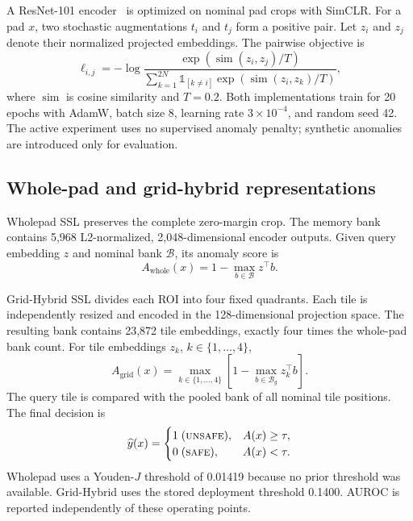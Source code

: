 A ResNet-101 encoder~\cite{he2016} is optimized on nominal pad crops with SimCLR. For a pad $x$, two stochastic augmentations $t_i$ and $t_j$ form a positive pair. Let $z_i$ and $z_j$ denote their normalized projected embeddings. The pairwise objective is
\begin{equation}
\ell_{i,j}=
-\log
\frac{\exp\!\left(\operatorname{sim}(z_i,z_j)/T\right)}
{\displaystyle\sum_{k=1}^{2N}\mathbb{1}_{[k\neq i]}
\exp\!\left(\operatorname{sim}(z_i,z_k)/T\right)},
\label{eq:ntxent}
\end{equation}
where $\operatorname{sim}$ is cosine similarity and $T=0.2$. Both implementations train for 20 epochs with AdamW, batch size 8, learning rate $3\times10^{-4}$, and random seed 42. The active experiment uses no supervised anomaly penalty; synthetic anomalies are introduced only for evaluation.

\subsection{Whole-pad and grid-hybrid representations}
Wholepad SSL preserves the complete zero-margin crop. The memory bank contains 5,968 L2-normalized, 2,048-dimensional encoder outputs. Given query embedding $z$ and nominal bank $\mathcal{B}$, its anomaly score is
\begin{equation}
A_{\mathrm{whole}}(x)
=1-\max_{b\in\mathcal{B}} z^{\top}b.
\label{eq:whole}
\end{equation}

Grid-Hybrid SSL divides each ROI into four fixed quadrants. Each tile is independently resized and encoded in the 128-dimensional projection space. The resulting bank contains 23,872 tile embeddings, exactly four times the whole-pad bank count. For tile embeddings $z_k$, $k\in\{1,\ldots,4\}$,
\begin{equation}
A_{\mathrm{grid}}(x)
=\max_{k\in\{1,\ldots,4\}}
\left[1-\max_{b\in\mathcal{B}_g}z_k^{\top}b\right].
\label{eq:grid}
\end{equation}
The query tile is compared with the pooled bank of all nominal tile positions. The final decision is
\begin{equation}
\widehat{y}(x)=
\begin{cases}
1\;(\textsc{unsafe}), & A(x)\geq\tau,\\
0\;(\textsc{safe}), & A(x)<\tau.
\end{cases}
\label{eq:decision}
\end{equation}
Wholepad uses a Youden-$J$ threshold of 0.01419 because no prior threshold was available. Grid-Hybrid uses the stored deployment threshold 0.1400. AUROC is reported independently of these operating points.

